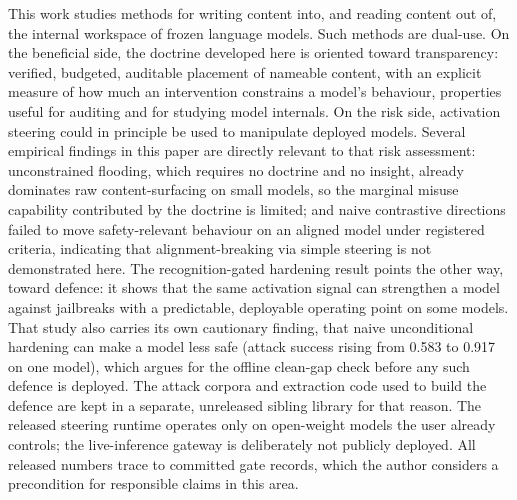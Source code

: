 This work studies methods for writing content into, and reading content out of, the internal workspace of frozen language models. Such methods are dual-use. On the beneficial side, the doctrine developed here is oriented toward transparency: verified, budgeted, auditable placement of nameable content, with an explicit measure of how much an intervention constrains a model's behaviour, properties useful for auditing and for studying model internals. On the risk side, activation steering could in principle be used to manipulate deployed models. Several empirical findings in this paper are directly relevant to that risk assessment: unconstrained flooding, which requires no doctrine and no insight, already dominates raw content-surfacing on small models, so the marginal misuse capability contributed by the doctrine is limited; and naive contrastive directions failed to move safety-relevant behaviour on an aligned model under registered criteria, indicating that alignment-breaking via simple steering is not demonstrated here. The recognition-gated hardening result points the other way, toward defence: it shows that the same activation signal can strengthen a model against jailbreaks with a predictable, deployable operating point on some models. That study also carries its own cautionary finding, that naive unconditional hardening can make a model less safe (attack success rising from 0.583 to 0.917 on one model), which argues for the offline clean-gap check before any such defence is deployed. The attack corpora and extraction code used to build the defence are kept in a separate, unreleased sibling library for that reason. The released steering runtime operates only on open-weight models the user already controls; the live-inference gateway is deliberately not publicly deployed. All released numbers trace to committed gate records, which the author considers a precondition for responsible claims in this area.
